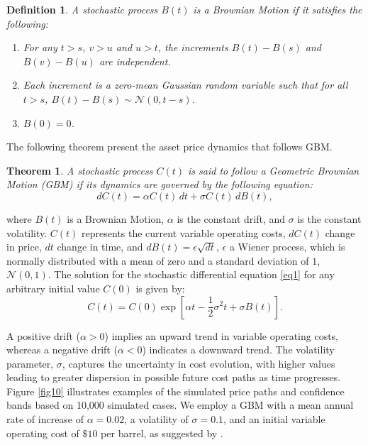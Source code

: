 \documentclass[pdflatex,sn-basic]{sn-jnl}%
\theoremstyle{thmstyleone}%
\newtheorem{theorem}{Theorem}%
\theoremstyle{thmstyletwo}%
\theoremstyle{thmstylethree}%
\newtheorem{definition}{Definition}%
\begin{document}
\begin{definition}
A stochastic process $B(t)$ is a Brownian Motion if it satisfies the following:
\begin{enumerate}[label=(\roman*)]
    \item For any $t > s$, $v > u$ and $u > t$, the increments $B(t) - B(s)$ and $B(v) - B(u)$ are independent.
    \item Each increment is a zero-mean Gaussian random variable such that for all $t > s$, $B(t) - B(s) \sim \mathcal{N}(0, t-s)$.
    \item $B(0) = 0$.
\end{enumerate}
\end{definition}

The following theorem present the asset price dynamics that follows GBM.

\begin{theorem}
\theoremstyle{thmstyletwo}
A stochastic process $C(t)$ is said to follow a Geometric Brownian Motion (GBM) if its dynamics are governed by the following equation: 
\begin{equation}
dC(t) = \alpha C(t)\,dt + \sigma C(t)\,dB(t),
\label{eq1}
\end{equation}
\end{theorem}
\noindent
where $B(t)$ is a Brownian Motion, $\alpha$ is the constant drift, and $\sigma$ is the constant volatility. $C(t)$ represents the current variable operating costs, $dC(t)$ change in price, $dt$ change in time, and $dB(t)=\epsilon \sqrt{dt}$, $\epsilon$ a Wiener process, which is normally distributed with a mean of zero and a standard deviation of $1$, $\mathcal{N}(0, 1)$. The solution for the stochastic differential equation \ref{eq1} for any arbitrary initial value $C(0)$ is given by:
\begin{equation}
C(t) = C(0) \exp\left[ \alpha t - \frac{1}{2} \sigma^2 t + \sigma B(t) \right].
\label{eq2}
\end{equation}

A positive drift ($\alpha > 0$) implies an upward trend in variable operating costs, whereas a negative drift ($\alpha < 0$) indicates a downward trend. The volatility parameter, $\sigma$, captures the uncertainty in cost evolution, with higher values leading to greater dispersion in possible future cost paths as time progresses. Figure \ref{fig10} illustrates examples of the simulated price paths and confidence bands based on 10,000 simulated cases. We employ a GBM with a mean annual rate of increase of $\alpha=0.02$, a volatility of $\sigma=0.1$, and an initial variable operating cost of $\$10$ per barrel, as suggested by \cite{ref12a}.
\end{document}
